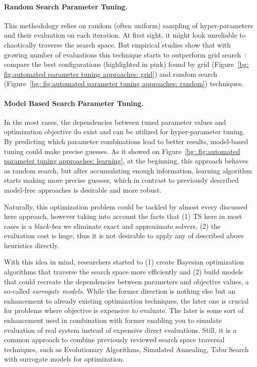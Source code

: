 \paragraph{Random Search Parameter Tuning.} This methodology relies on random (often uniform) sampling of hyper-parameters and their evaluation on each iteration. At first sight, it might look unreliable to chaotically traverse the search space. But empirical studies show that with growing number of evaluations this technique starts to outperform grid search~\cite{bergstra2012random}: compare the best configurations (highlighted in pink) found by grid (Figure~\ref{bg: fig:automated parameter tuning approaches: grid}) and random search (Figure~\ref{bg: fig:automated parameter tuning approaches: random}) techniques.

\paragraph{Model Based Search Parameter Tuning.} In the most cases, the dependencies between tuned parameter values and optimization objective do exist and can be utilized for hyper-parameter tuning. By predicting which parameter combinations lead to better results, model-based tuning could make precise guesses. As it showed on Figure~\ref{bg: fig:automated parameter tuning approaches: learning}, at the beginning, this approach behaves as random search, but after accumulating enough information, learning algorithm starts making more precise guesses, which in contrast to previously described model-free approaches is desirable and more robust.

Naturally, this optimization problem could be tackled by almost every discussed here approach, however taking into account the facts that (1) TS here in most cases is a \textit{black-box} we eliminate exact and approximate solvers, (2) the evaluation cost is huge, thus it is not desirable to apply any of described above heuristics directly.

With this idea in mind, researchers started to (1) create  Bayesian optimization algorithms that traverse the search space more efficiently and (2) build models that could recreate the dependencies between parameters and objective values, a so-called \textit{surrogate models}. While the former direction is nothing else but an enhancement to already existing optimization techniques, the later one is crucial for problems where objective is expensive to evaluate.
The later is some sort of enhancement used in combination with former enabling you to simulate evaluation of real system instead of expensive direct evaluations. Still, it is a common approach to combine previously reviewed search space traversal techniques, such as Evolutionary Algorithms, Simulated Annealing, Tabu Search with surrogate models for optimization.


